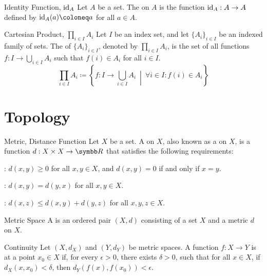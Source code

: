 \documentclass[12pt]{report}
\begin{document}
\begin{dfnbox}{Identity Function, $\operatorname{id}_A$}
	Let $A$ be a set. The  on $A$ is the function $\operatorname{id}_A: A \to A$ defined by $\id_A(a) \coloneq a$ for all $a \in A$.
\end{dfnbox}

\begin{dfnbox}{Cartesian Product, $\prod_{i \in I} A_i$}
	Let $I$ be an index set, and let $\{ A_i \}_{i \in I}$ be an indexed family of sets. The  of $\{ A_i \}_{i \in I}$, denoted by $\prod_{i \in I} A_i$, is the set of all functions $f: I \to \bigcup_{i \in I} A_i$ such that $f(i) \in A_i$ for all $i \in I$.
	\[ \prod_{i \in I} A_i \coloneq \left\{ f: I \to \bigcup_{i \in I} A_i \ \middle|\ \forall i \in I : f(i) \in A_i \right\} \]
\end{dfnbox}



\chapter{Topology}

\begin{dfnbox}{Metric, Distance Function}
	Let $X$ be a set. A  on $X$, also known as a  on $X$, is a function $d: X \times X \to \R$ that satisfies the following requirements:
	\begin{boxitems}
		\item {}: $d(x, y) \ge 0$ for all $x, y \in X$, and $d(x, y) = 0$ if and only if $x = y$.
		\item {}: $d(x, y) = d(y, x)$ for all $x, y \in X$.
		\item {}: $d(x, z) \le d(x, y) + d(y, z)$ for all $x, y, z \in X$.
	\end{boxitems}
\end{dfnbox}

\begin{dfnbox}{Metric Space}
	A  is an ordered pair $(X, d)$ consisting of a set $X$ and a metric $d$ on $X$.
\end{dfnbox}

\begin{dfnbox}{Continuity}
	Let $(X, d_X)$ and $(Y, d_Y)$ be metric spaces. A function $f: X \to Y$ is  at a point $x_0 \in X$ if, for every $\epsilon > 0$, there exists $\delta > 0$, such that for all $x \in X$, if $d_X(x, x_0) < \delta$, then $d_Y(f(x), f(x_0)) < \epsilon$.
\end{dfnbox}
\end{document}
